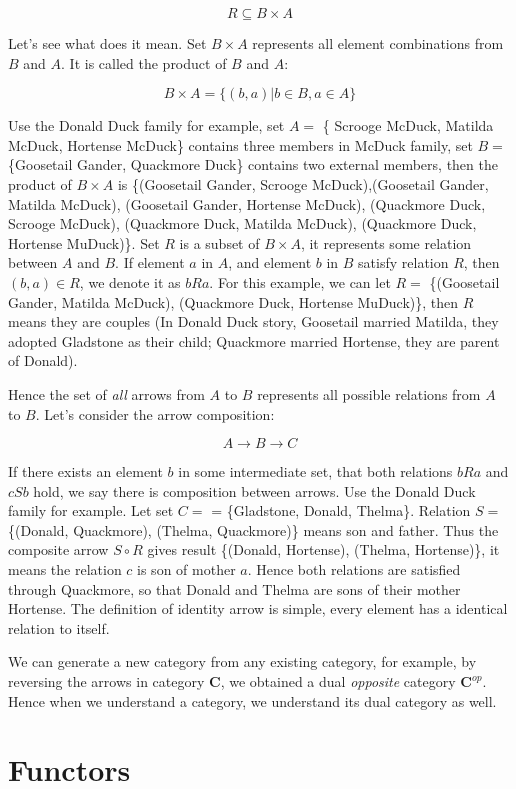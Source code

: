 \documentclass{article}
\begin{document}
\[
R \subseteq B \times A
\]

Let's see what does it mean. Set $B \times A$ represents all element combinations from $B$ and $A$. It is called the product of $B$ and $A$:

\[
B \times A = \{(b, a) | b \in B, a \in A\}
\]

Use the Donald Duck family for example, set $A =$ \{ Scrooge McDuck, Matilda McDuck, Hortense McDuck\} contains three members in McDuck family, set $B = $ \{Goosetail Gander, Quackmore Duck\} contains two external members, then the product of $B \times A$ is \{(Goosetail Gander, Scrooge McDuck),(Goosetail Gander, Matilda McDuck), (Goosetail Gander, Hortense McDuck), (Quackmore Duck, Scrooge McDuck), (Quackmore Duck, Matilda McDuck), (Quackmore Duck, Hortense MuDuck)\}. Set $R$ is a subset of $B \times A$, it represents some relation between $A$ and $B$. If element $a$ in $A$, and element $b$ in $B$ satisfy relation $R$, then $(b, a) \in R$, we denote it as $bRa$. For this example, we can let $R=$ \{(Goosetail Gander, Matilda McDuck), (Quackmore Duck, Hortense MuDuck)\}, then $R$ means they are couples (In Donald Duck story, Goosetail married Matilda, they adopted Gladstone as their child; Quackmore married Hortense, they are parent of Donald).

Hence the set of {\em all} arrows from $A$ to $B$ represents all possible relations from $A$ to $B$. Let's consider the arrow composition:

\[
A \to B \to C
\]

If there exists an element $b$ in some intermediate set, that both relations $bRa$ and $cSb$ hold, we say there is composition between arrows. Use the Donald Duck family for example. Let set $C=$ = \{Gladstone, Donald, Thelma\}. Relation $S=$ \{(Donald, Quackmore), (Thelma, Quackmore)\} means son and father. Thus the composite arrow $S \circ R$ gives result \{(Donald, Hortense), (Thelma, Hortense)\}, it means the relation $c$ is son of mother $a$. Hence both relations are satisfied through Quackmore, so that Donald and Thelma are sons of their mother Hortense. The definition of identity arrow is simple, every element has a identical relation to itself.

We can generate a new category from any existing category, for example, by reversing the arrows in category $\pmb{C}$, we obtained a dual {\em opposite} category $\pmb{C}^{op}$. Hence when we understand a category, we understand its dual category as well.

\section{Functors}
\end{document}
